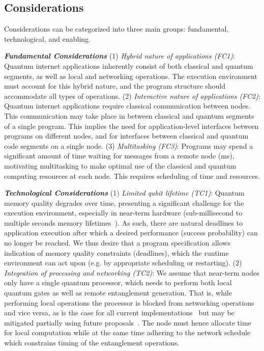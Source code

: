 \subsection{Considerations}
Considerations can be categorized into three main groups: fundamental, technological, and enabling.

\noindent\textit{\textbf{Fundamental Considerations}}
(1) \textit{Hybrid nature of applications (FC1)}: Quantum internet applications inherently consist of both classical and quantum segments, as well as local and networking operations. The execution environment must account for this hybrid nature, and the program structure should accommodate all types of operations.
(2) \textit{Interactive nature of applications (FC2)}: Quantum internet applications require classical communication between nodes. This communication may take place in between classical and quantum segments of a single program. 
This implies the need for application-level interfaces between programs on different nodes, and for interfaces between classical and quantum code segments on a single node.
(3) \textit{Multitasking (FC3)}: Programs may spend a significant amount of time waiting for messages from a remote node (ms), motivating multitasking to make optimal use of the classical and quantum computing resources at each node.  This requires scheduling of time and resources.

\noindent\textit{\textbf{Technological Considerations}}
(1) \textit{Limited qubit lifetime (TC1)}:
Quantum memory quality degrades over time, presenting a significant challenge for the execution environment,
especially in near-term hardware (sub-millisecond to multiple seconds memory lifetimes~\cite{ruf2021quantum, pompili2021realization, krutyanskiy2023telecom}).
As such, there are natural deadlines to application execution after which a desired performance (success probability) can no longer be reached.
We thus desire that a program specification allows indication of memory quality constraints (deadlines), which the runtime environment can act upon (e.g. by appropriate scheduling or restarting).
(2) \textit{Integration of processing and networking (TC2)}: We assume that near-term nodes only have a single quantum processor, which needs to perform both local quantum gates as well as remote entanglement generation.
That is, while performing local operations the processor is blocked from networking operations and vice versa, as is the case for all current implementations~\cite{pompili2021realization, krutyanskiy2023entanglement} but may be mitigated partially using future proposals~\cite{vardoyan2022quantum}. 
The node must hence allocate time for local computation while at the same time adhering to the network schedule which constrains timing of the entanglement operations.

